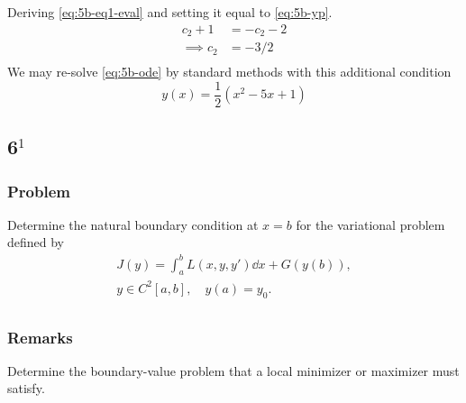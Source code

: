 \documentclass[12pt,twoside]{article}
\begin{document}
Deriving \cref{eq:5b-eq1-eval} and setting it equal to \cref{eq:5b-yp}.
\begin{equation*}
  \begin{aligned}
    c_2 + 1 &= -c_2 - 2 \\
    \implies c_2 &= -3/2 \\
  \end{aligned}
\end{equation*}
We may re-solve \cref{eq:5b-ode} by standard methods with this additional condition
\begin{equation*}
\boxed{y(x) = \frac{1}{2} \left(x^2-5 x+1\right)}
\end{equation*}

\subsection{6$^1$}
\subsubsection*{Problem}
Determine the natural boundary condition at $x=b$ for the variational problem
defined by
\begin{equation}
  \begin{aligned}
    J(y) = \int_a^b L(x,y,y')\dd{x}+G(y(b)), \\
    y\in C^2[a,b],\quad y(a)=y_0. \\
  \end{aligned}
\end{equation}
\subsubsection*{Remarks}
Determine the boundary-value problem that a local minimizer or maximizer must
satisfy.
\end{document}
